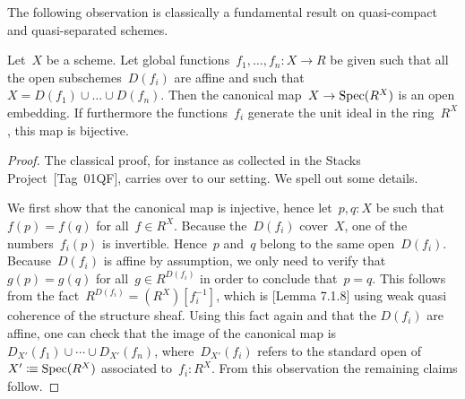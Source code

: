 


The following observation is classically a fundamental result on quasi-compact
and quasi-separated schemes.

\begin{lemma}\label{enough-functions-affine}
  Let~$X$ be a scheme. Let global functions~$f_1,\ldots,f_n : X \to R$ be given
  such that all the open subschemes~$D(f_i)$ are affine and such that~$X =
  D(f_1) \cup \ldots \cup D(f_n)$. Then the canonical map~$X \to \operatorname{Spec}(R^X)$ is
  an open embedding. If furthermore the functions~$f_i$ generate the unit ideal
  in the ring~$R^X$, this map is bijective.
\end{lemma}

\begin{proof}
  The classical proof, for instance as collected in the Stacks
  Project~\cite{stacks}[Tag~01QF], carries over to our setting. We spell out
  some details.

  We first show that the canonical map is injective, hence let~$p,q : X$ be such
  that~$f(p) = f(q)$ for all~$f \in R^X$. Because the~$D(f_i)$ cover~$X$, one
  of the numbers~$f_i(p)$ is invertible. Hence~$p$ and~$q$ belong to the same
  open~$D(f_i)$. Because~$D(f_i)$ is affine by assumption, we only need to
  verify that~$g(p) = g(q)$ for all~$g \in R^{D(f_i)}$ in order to conclude
  that~$p = q$.
  This follows from the fact~$R^{D(f_i)} = (R^X)[f_i^{-1}]$,
  which is \cite{draft}[Lemma 7.1.8] using weak quasi coherence of the structure sheaf.
  Using this fact again and that the $D(f_i)$ are affine,
  one can check that the image of the canonical map is~$D_{X'}(f_1) \cup \cdots
  \cup D_{X'}(f_n)$, where~$D_{X'}(f_i)$ refers to the standard open of~$X'
  \vcentcolon\mspace{-1.2mu}\equiv \operatorname{Spec}(R^X)$ associated to~$f_i : R^X$. From this observation the
  remaining claims follow.
\end{proof}

